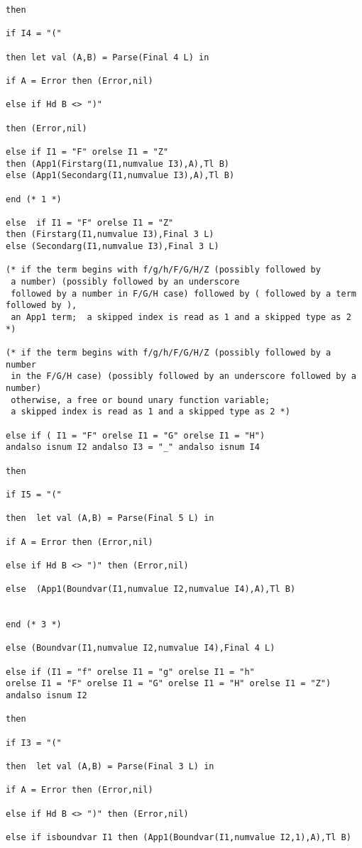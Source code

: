 \documentclass{article}
\begin{document}
{{\begin{verbatim}
then

if I4 = "("

then let val (A,B) = Parse(Final 4 L) in

if A = Error then (Error,nil)

else if Hd B <> ")"

then (Error,nil)

else if I1 = "F" orelse I1 = "Z" 
then (App1(Firstarg(I1,numvalue I3),A),Tl B) 
else (App1(Secondarg(I1,numvalue I3),A),Tl B)

end (* 1 *)

else  if I1 = "F" orelse I1 = "Z" 
then (Firstarg(I1,numvalue I3),Final 3 L) 
else (Secondarg(I1,numvalue I3),Final 3 L)

(* if the term begins with f/g/h/F/G/H/Z (possibly followed by
 a number) (possibly followed by an underscore
 followed by a number in F/G/H case) followed by ( followed by a term followed by ),
 an App1 term;  a skipped index is read as 1 and a skipped type as 2 *)

(* if the term begins with f/g/h/F/G/H/Z (possibly followed by a number
 in the F/G/H case) (possibly followed by an underscore followed by a number) 
 otherwise, a free or bound unary function variable; 
 a skipped index is read as 1 and a skipped type as 2 *)

else if ( I1 = "F" orelse I1 = "G" orelse I1 = "H") 
andalso isnum I2 andalso I3 = "_" andalso isnum I4

then

if I5 = "("

then  let val (A,B) = Parse(Final 5 L) in

if A = Error then (Error,nil)

else if Hd B <> ")" then (Error,nil)

else  (App1(Boundvar(I1,numvalue I2,numvalue I4),A),Tl B)


end (* 3 *)

else (Boundvar(I1,numvalue I2,numvalue I4),Final 4 L)

else if (I1 = "f" orelse I1 = "g" orelse I1 = "h" 
orelse I1 = "F" orelse I1 = "G" orelse I1 = "H" orelse I1 = "Z") andalso isnum I2

then

if I3 = "("

then  let val (A,B) = Parse(Final 3 L) in

if A = Error then (Error,nil)

else if Hd B <> ")" then (Error,nil)

else if isboundvar I1 then (App1(Boundvar(I1,numvalue I2,1),A),Tl B)


\end{verbatim}}}
\end{document}
